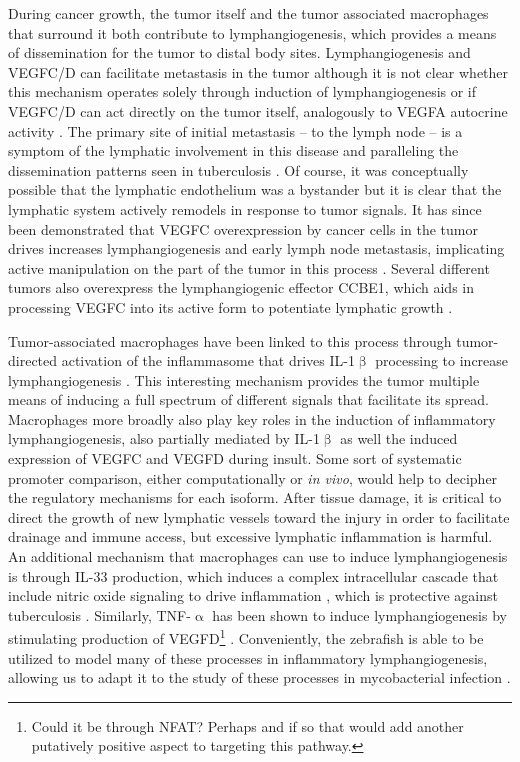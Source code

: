 During cancer growth, the tumor itself and the tumor associated macrophages that surround it both contribute to lymphangiogenesis, which provides a means of dissemination for the tumor to distal body sites. Lymphangiogenesis and VEGFC/D can facilitate metastasis in the tumor although it is not clear whether this mechanism operates solely through induction of lymphangiogenesis or if VEGFC/D can act directly on the tumor itself, analogously to VEGFA autocrine activity \citep{Stacker2014}. The primary site of initial metastasis -- to the lymph node -- is a symptom of the lymphatic involvement in this disease and paralleling the dissemination patterns seen in tuberculosis \citep{Ganchua2020}. Of course, it was conceptually possible that the lymphatic endothelium was a bystander but it is clear that the lymphatic system actively remodels in response to tumor signals. It has since been demonstrated that VEGFC overexpression by cancer cells in the tumor drives increases lymphangiogenesis and early lymph node metastasis, implicating active manipulation on the part of the tumor in this process \citep{Duong2012}. Several different tumors also overexpress the lymphangiogenic effector CCBE1, which aids in processing VEGFC into its active form to potentiate lymphatic growth \citep{Hogan2009, LeGuen2014, Li2018b, Song2020, Zhao2018}.

Tumor\hyp{}associated macrophages have been linked to this process through tumor\hyp{}directed activation of the inflammasome that drives IL\hyp{}1$\upbeta$ processing to increase lymphangiogenesis \citep{Weichand2017}. This interesting mechanism provides the tumor multiple means of inducing a full spectrum of different signals that facilitate its spread. Macrophages more broadly also play key roles in the induction of inflammatory lymphangiogenesis, also partially mediated by IL\hyp{}1$\upbeta$ as well the induced expression of VEGFC and VEGFD during insult. Some sort of systematic promoter comparison, either computationally or \textit{in vivo}, would help to decipher the regulatory mechanisms for each isoform. After tissue damage, it is critical to direct the growth of new lymphatic vessels toward the injury in order to facilitate drainage and immune access, but excessive lymphatic inflammation is harmful. An additional mechanism that macrophages can use to induce lymphangiogenesis is through IL\hyp{}33 production, which induces a complex intracellular cascade that include nitric oxide signaling to drive inflammation \citep{Han2017}, which is protective against tuberculosis \citep{Villarreal2015, Pineros2017}. Similarly, TNF\hyp{}$\upalpha$ has been shown to induce lymphangiogenesis by stimulating production of VEGFD\footnote{Could it be through NFAT? Perhaps and if so that would add another putatively positive aspect to targeting this pathway.} \citep{Hong2016}. Conveniently, the zebrafish is able to be utilized to model many of these processes in inflammatory lymphangiogenesis, allowing us to adapt it to the study of these processes in mycobacterial infection \citep{Okuda2015}.

